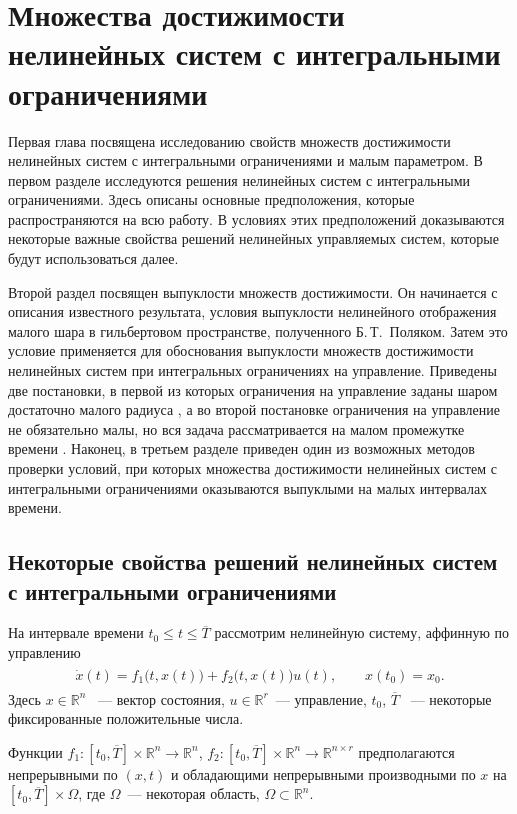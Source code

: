 \documentclass[../main.tex]{subfiles}
\begin{document}
\clearpage
\section{Множества достижимости нелинейных систем с интегральными ограничениями}
\label{s1}
Первая глава посвящена исследованию свойств множеств достижимости нелинейных систем с интегральными ограничениями и малым параметром.
В первом разделе исследуются решения нелинейных систем с интегральными ограничениями.
Здесь описаны основные предположения, которые распространяются на всю работу.
В условиях этих предположений доказываются некоторые важные свойства решений нелинейных управляемых систем, которые будут использоваться далее. 
 
Второй раздел посвящен выпуклости множеств достижимости.
Он начинается с описания известного результата, условия выпуклости нелинейного отображения малого шара в гильбертовом пространстве, полученного Б.\,Т.~Поляком\cite{Polyak2001, Polyak2001ru}.
Затем это условие применяется для обоснования выпуклости множеств достижимости нелинейных систем при интегральных ограничениях на управление.
Приведены две постановки, в первой из которых ограничения на управление заданы шаром достаточно малого радиуса \cite{Polyak2004}, а во второй постановке ограничения на управление не обязательно малы, но вся задача рассматривается на малом промежутке времени \cite{GusevMotor, GusevOsipovTrudy}.
Наконец, в третьем разделе приведен один из возможных методов проверки условий, при которых множества достижимости нелинейных систем с интегральными ограничениями оказываются выпуклыми на малых интервалах времени. 
 
 
\subsection{Некоторые свойства решений нелинейных систем с интегральными ограничениями}
На интервале времени $ t_0 \leqslant t \leqslant \overline{T} $ рассмотрим нелинейную систему, аффинную по управлению
\begin{gather}\label{s1:common_nonlinear}
\begin{gathered}
 \dot{x}(t)=f_1\big(t,x(t)\big)+f_2\big(t,x(t)\big)u(t), \qquad x(t_0) = x_0.
\end{gathered}
\end{gather}
Здесь $ x \in \mathbb{R}^n $ ~--- вектор состояния, $ u \in \mathbb{R}^r $~--- управление, $t_0$, $ \overline{T} $ ~--- некоторые фиксированные положительные числа.
 
Функции $ f_1: [t_0, \overline{T}] \times \mathbb{R}^n \rightarrow \mathbb{R}^{n} $, $ f_2: [t_0, \overline{T}] \times \mathbb{R}^n \rightarrow \mathbb{R}^{n \times r} $ предполагаются непрерывными по $(x,t)$ и обладающими непрерывными производными по $ x $ на $ [t_0, \overline{T}] \times \Omega $, где $\Omega$~--- некоторая область, $\Omega \subset \mathbb{R}^n$. 
\end{document}
